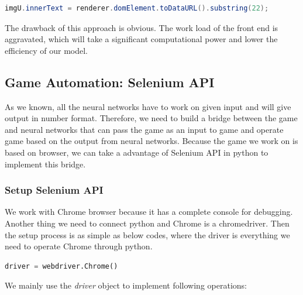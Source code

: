 \documentclass{article}
\begin{document}
\begin{lstlisting}[language = Java]
imgU.innerText = renderer.domElement.toDataURL().substring(22);
\end{lstlisting}

The drawback of this approach is obvious. The work load of the front end is aggravated, which will take a significant computational power and lower the efficiency of our model. 

\subsection{Game Automation: Selenium API}
As we known, all the neural networks have to work on given input and will give output in number format. Therefore, we need to build a bridge between the game and neural networks that can pass the game as an input to game and operate game based on the output from neural networks. Because the game we work on is based on browser, we can take a advantage of Selenium API in python to implement this bridge. 

\subsubsection{Setup Selenium API}
We work with Chrome browser because it has a complete console for debugging. Another thing we need to connect python and Chrome is a chromedriver. Then the setup process is as simple as below codes, where the driver is everything we need to operate Chrome through python.
\begin{lstlisting}[language=Python]
    driver = webdriver.Chrome()
\end{lstlisting}

We mainly use the \textit{driver} object to implement following operations:
\end{document}
